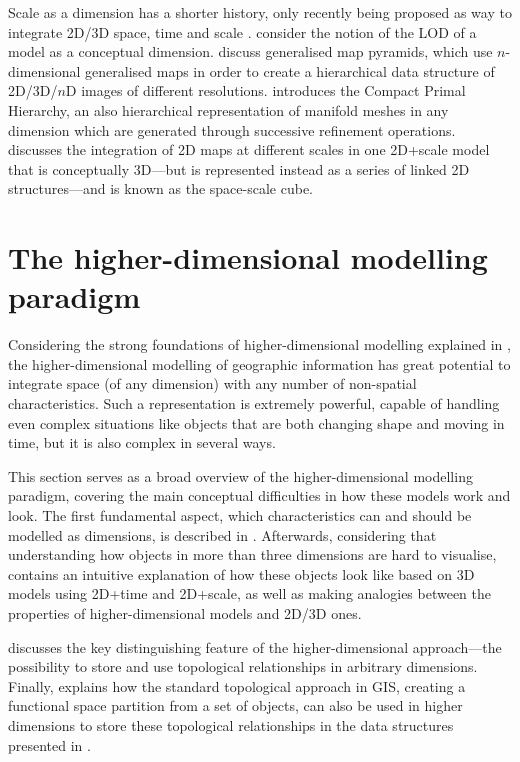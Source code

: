 
Scale as a dimension has a shorter history, only recently being proposed as way to integrate 2D/3D space, time and scale \citep{vanOosterom10}.
\citet{Dollner05} consider the notion of the LOD of a model as a conceptual dimension.
\citet{Grasset-Simon06} discuss generalised map pyramids, which use $n$-dimensional generalised maps in order to create a hierarchical data structure of 2D/3D/$n$D images of different resolutions.
\citet{Untereiner15} introduces the Compact Primal Hierarchy, an also hierarchical representation of manifold meshes in any dimension which are generated through successive refinement operations.
\citet{vanOosterom14} discusses the integration of 2D maps at different scales in one 2D+scale model that is conceptually 3D---but is represented instead as a series of linked 2D structures---and is known as the space-scale cube.

\section{The higher-dimensional modelling paradigm}
\label{se:nd-modelling-paradigm}

Considering the strong foundations of higher-dimensional modelling explained in , the higher-dimensional modelling of geographic information has great potential to integrate space (of any dimension) with any number of non-spatial characteristics.
Such a representation is extremely powerful, capable of handling even complex situations like objects that are both changing shape and moving in time, but it is also complex in several ways.

This section serves as a broad overview of the higher-dimensional modelling paradigm, covering the main conceptual difficulties in how these models work and look.
The first fundamental aspect, which characteristics can and should be modelled as dimensions, is described in .
Afterwards, considering that understanding how objects in more than three dimensions are hard to visualise,  contains an intuitive explanation of how these objects look like based on 3D models using 2D+time and 2D+scale, as well as making analogies between the properties of higher-dimensional models and 2D/3D ones.

 discusses the key distinguishing feature of the higher-dimensional approach---the possibility to store and use topological relationships in arbitrary dimensions.
Finally,  explains how the standard topological approach in GIS, creating a functional space partition from a set of objects, can also be used in higher dimensions to store these topological relationships in the data structures presented in .

